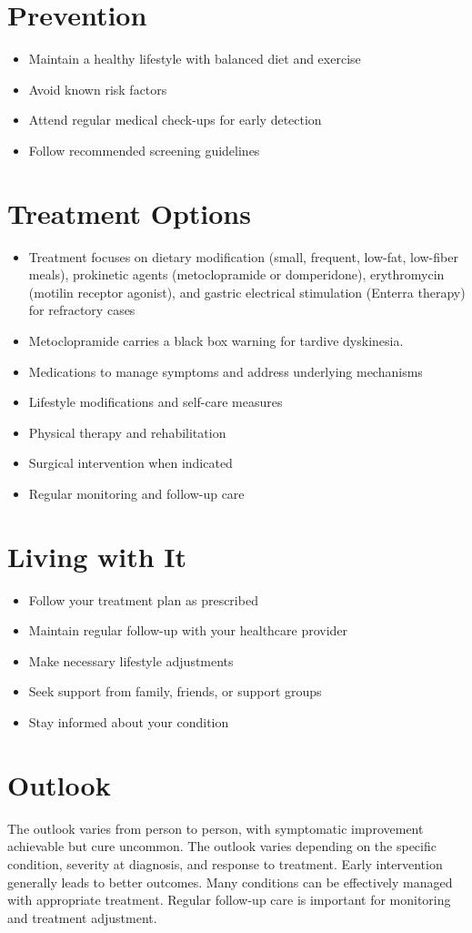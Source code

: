 \section{Prevention}
\begin{itemize}[noitemsep]
  \item Maintain a healthy lifestyle with balanced diet and exercise
  \item Avoid known risk factors
  \item Attend regular medical check-ups for early detection
  \item Follow recommended screening guidelines
\end{itemize}
\section{Treatment Options}
\begin{itemize}[noitemsep]
  \item Treatment focuses on dietary modification (small, frequent, low-fat, low-fiber meals), prokinetic agents (metoclopramide or domperidone), erythromycin (motilin receptor agonist), and gastric electrical stimulation (Enterra therapy) for refractory cases
  \item Metoclopramide carries a black box warning for tardive dyskinesia.
  \item Medications to manage symptoms and address underlying mechanisms
  \item Lifestyle modifications and self-care measures
  \item Physical therapy and rehabilitation
  \item Surgical intervention when indicated
  \item Regular monitoring and follow-up care
\end{itemize}
\section{Living with It}
\begin{itemize}[noitemsep]
  \item Follow your treatment plan as prescribed
  \item Maintain regular follow-up with your healthcare provider
  \item Make necessary lifestyle adjustments
  \item Seek support from family, friends, or support groups
  \item Stay informed about your condition
\end{itemize}
\section{Outlook}
The outlook varies from person to person, with symptomatic improvement achievable but cure uncommon. The outlook varies depending on the specific condition, severity at diagnosis, and response to treatment. Early intervention generally leads to better outcomes. Many conditions can be effectively managed with appropriate treatment. Regular follow-up care is important for monitoring and treatment adjustment.
